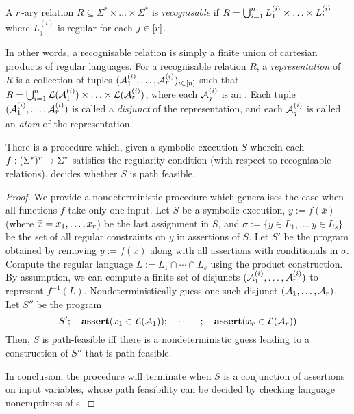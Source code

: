 \begin{definition}
    A $r$-ary relation $R\subseteq \Sigma^*\times \ldots\times \Sigma^*$ is \emph{recognisable}  if $R=\bigcup_{i=1}^n L^{(i)}_1\times \ldots\times L^{(i)}_r$ where $L^{(i)}_j$ is regular for each $j\in [r]$.
%
\end{definition}
In other words, a recognisable relation is simply a finite union of 
cartesian products of regular languages. 
For a recognisable relation $R$, a \emph{representation} of $R$ is a collection of tuples $(\mathcal{A}^{(i)}_1, \ldots, \mathcal{A}^{(i)}_r)_{i\in [n]}$  such that 
$R = \bigcup_{i=1}^n \mathcal{L}(\mathcal{A}^{(i)}_1) \times \ldots\times \mathcal{L}(\mathcal{A}^{(i)}_r)$, where each $\mathcal{A}^{(i)}_j$ is an \FA. 
Each tuple $(\mathcal{A}^{(i)}_1, \ldots, \mathcal{A}^{(i)}_r)$ is called a \emph{disjunct} of the representation, and  each \FA{} $\mathcal{A}^{(i)}_j$ is called an \emph{atom} of the representation.
%
\begin{theorem}
    There is a procedure which, given a symbolic execution $S$ wherein 
    each $f: (\Sigma^*)^r \to \Sigma^*$ satisfies the regularity 
    condition (with respect to recognisable relations), decides whether $S$
    is path feasible.
    \label{th:gen}
\end{theorem}
%
\begin{proof}
    We provide a nondeterministic procedure which generalises the case when
    all functions $f$ take only one input. Let $S$  be a symbolic execution, $y := f(\bar x)$ (where
    $\bar x = x_1,\ldots,x_r$) be the last
    assignment in $S$, and $\sigma := \{ y \in L_1,\ldots, y \in L_s\}$
    be the set of all regular constraints on $y$ in assertions of $S$.
    Let $S'$ be the program obtained by removing $y := f(\bar x)$ along
    with all assertions with conditionals in $\sigma$.
    Compute the regular language $L := L_1 \cap \cdots \cap L_s$ using
    the product construction. By 
    assumption, we can compute a finite set of disjuncts
    $(\mathcal{A}^{(i)}_1, \ldots, \mathcal{A}^{(i)}_r)$  to represent
    $f^{-1}(L)$. Nondeterministically guess one such disjunct
    $(\mathcal{A}_1, \ldots, \mathcal{A}_r)$. Let $S''$ be the program 
    \[
        S'; \quad \textbf{assert}(x_1 \in \mathcal{L}(\mathcal{A}_1)); \quad \cdots\quad ; \quad \textbf{assert}(x_r \in
        \mathcal{L}(\mathcal{A}_r))
    \]
    Then, $S$ is path-feasible iff there is a nondeterministic guess leading
    to a construction of $S''$ that is path-feasible. 

    In conclusion, the procedure will terminate when $S$ is a conjunction of
    assertions on input variables, whose path feasibility can be
    decided by checking language nonemptiness of \FA{}s.
\end{proof}



